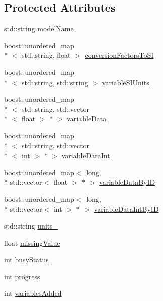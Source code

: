 \subsection*{Protected Attributes}
\begin{DoxyCompactItemize}
\item 
std\-::string \hyperlink{classccmc_1_1_model_a6165e9aac67ae0cbe536e350d03161f3}{model\-Name}
\item 
boost\-::unordered\-\_\-map\\*
$<$ std\-::string, float $>$ \hyperlink{classccmc_1_1_model_ab62ff417dd01ef7137490747cb0b3641}{conversion\-Factors\-To\-S\-I}
\item 
boost\-::unordered\-\_\-map\\*
$<$ std\-::string, std\-::string $>$ \hyperlink{classccmc_1_1_model_af782a4c86004df7b9388562551ae87ad}{variable\-S\-I\-Units}
\item 
boost\-::unordered\-\_\-map\\*
$<$ std\-::string, std\-::vector\\*
$<$ float $>$ $\ast$ $>$ \hyperlink{classccmc_1_1_model_a69edb30c3bc8ce3c68ec0a883c219d94}{variable\-Data}
\item 
boost\-::unordered\-\_\-map\\*
$<$ std\-::string, std\-::vector\\*
$<$ int $>$ $\ast$ $>$ \hyperlink{classccmc_1_1_model_a7dd720b592092ee2e1f24c162b712606}{variable\-Data\-Int}
\item 
boost\-::unordered\-\_\-map$<$ long, \\*
std\-::vector$<$ float $>$ $\ast$ $>$ \hyperlink{classccmc_1_1_model_ad73147779c03081227de041ffe4542a8}{variable\-Data\-By\-I\-D}
\item 
boost\-::unordered\-\_\-map$<$ long, \\*
std\-::vector$<$ int $>$ $\ast$ $>$ \hyperlink{classccmc_1_1_model_a699883059cbb36f977a724c7855b0d76}{variable\-Data\-Int\-By\-I\-D}
\item 
std\-::string \hyperlink{classccmc_1_1_model_ac6ae99aaeac03d14ffde2e82c39b436a}{units\-\_\-}
\item 
float \hyperlink{classccmc_1_1_model_ae18cabca92352739be2b97f0ee973475}{missing\-Value}
\item 
int \hyperlink{classccmc_1_1_model_acee07d9abc8cb8c0bc3fbaeb879cc251}{busy\-Status}
\item 
int \hyperlink{classccmc_1_1_model_a300d5ede0268098899a9fb248281ead5}{progress}
\item 
int \hyperlink{classccmc_1_1_model_aa56cc5aabd75f24aba74103bb3970abb}{variables\-Added}
\end{DoxyCompactItemize}


